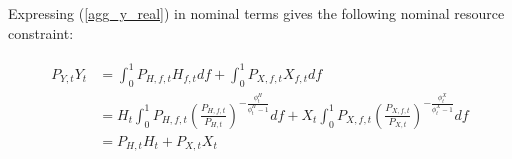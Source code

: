 \documentclass[a4paper,11pt]{article}
\numberwithin{equation}{section}
\begin{document}
%	
%	
%	
	
%	
%	
%	
	
	Expressing (\ref{agg_y_real}) in nominal terms gives the following nominal resource constraint:
	
	\begin{align}
	\begin{split}
	P_{Y,t}Y_t &= \int_{0}^{1}P_{H,f,t}H_{f,t}df+\int_{0}^{1}P_{X,f,t}X_{f,t}df \\
	           &= H_t\int_{0}^{1}P_{H,f,t}\left(\frac{P_{H,f,t}}{P_{H,t}}\right)^{-\frac{\phi_t^H}{\phi_t^H-1}}df+X_t\int_{0}^{1}P_{X,f,t}\left(\frac{P_{X,f,t}}{P_{X,t}}\right)^{-\frac{\phi_t^X}{\phi_t^X-1}}df \\
	           &= P_{H,t}H_t+P_{X,t}X_t
	\end{split}
	\end{align}
	
\end{document}

